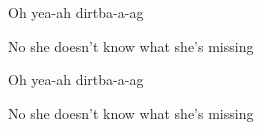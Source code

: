 \begin{song}
\bigskip

  Oh yea-ah  dirtba-a-ag \par
No she doesn’t know what she’s missing \par
{}  Oh yea-ah  dirtba-a-ag \par
No she doesn’t know what she’s missing \par
{}      \par
{}     \par

\end{song}